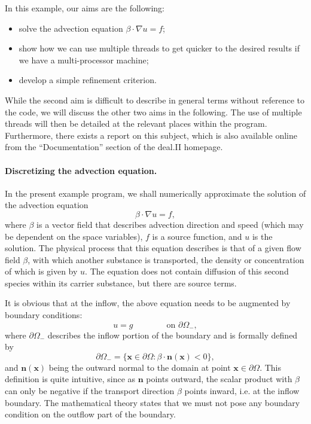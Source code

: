 \documentclass{article}
\renewcommand{\vec}[1]{{\mathbf #1}}
\begin{document}
In this example, our aims are the following:
\begin{itemize}
  \item solve the advection equation $\beta \cdot \nabla u = f$;
  \item show how we can use multiple threads to get quicker to
    the desired results if we have a multi-processor machine;
  \item develop a simple refinement criterion.
\end{itemize}
While the second aim is difficult to describe in general terms without
reference to the code, we will discuss the other two aims in the
following. The use of multiple threads will then be detailed at the
relevant places within the program. Furthermore, there exists a report on this
subject, which is also available online from the ``Documentation'' section of
the deal.II homepage.

\paragraph{Discretizing the advection equation.}
In the present example program, we shall numerically approximate the
solution of the advection equation
$$
  \beta \cdot \nabla u = f,
$$
where $\beta$ is a vector field that describes advection direction and
speed (which may be dependent on the space variables), $f$ is a source
function, and $u$ is the solution. The physical process that this
equation describes is that of a given flow field $\beta$, with which
another substance is transported, the density or concentration of
which is given by $u$. The equation does not contain diffusion of this
second species within its carrier substance, but there are source
terms.

It is obvious that at the inflow, the above equation needs to be
augmented by boundary conditions:
$$
  u = g \qquad\qquad \text{on $\partial\Omega_-$},
$$
where $\partial\Omega_-$ describes the inflow portion of the boundary and is
formally defined by
$$
  \partial\Omega_- 
  =
  \{\vec x\in \partial\Omega: \beta\cdot\vec n(\vec x) < 0\},
$$
and $\vec n(\vec x)$ being the outward normal to the domain at point
$\vec x\in\partial\Omega$. This definition is quite intuitive, since
as $\vec n$ points outward, the scalar product with $\beta$ can only
be negative if the transport direction $\beta$ points inward, i.e. at
the inflow boundary. The mathematical theory states that we must not
pose any boundary condition on the outflow part of the boundary.
\end{document}
